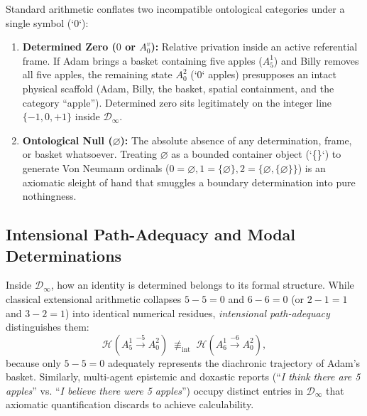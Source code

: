 \documentclass[11pt,a4paper]{article}
\begin{document}
Standard arithmetic conflates two incompatible ontological categories under a single symbol (`0`):
\begin{enumerate}[label=\textbf{(\roman*)}]
    \item \textbf{Determined Zero ($0$ or $A_0^v$):} Relative privation inside an active referential frame. If Adam brings a basket containing five apples ($A_5^1$) and Billy removes all five apples, the remaining state $A_0^2$ (`0` apples) presupposes an intact physical scaffold (Adam, Billy, the basket, spatial containment, and the category ``apple''). Determined zero sits legitimately on the integer line $\{-1, 0, +1\}$ inside $\mathcal{D}_\infty$.
    \item \textbf{Ontological Null ($\varnothing$):} The absolute absence of any determination, frame, or basket whatsoever. Treating $\varnothing$ as a bounded container object (`\{\varnothing\}`) to generate Von Neumann ordinals ($0 = \varnothing, 1 = \{\varnothing\}, 2 = \{\varnothing, \{\varnothing\}\}$) is an axiomatic sleight of hand that smuggles a boundary determination into pure nothingness.
\end{enumerate}

\subsection{Intensional Path-Adequacy and Modal Determinations}

Inside $\mathcal{D}_\infty$, how an identity is determined belongs to its formal structure. While classical extensional arithmetic collapses $5 - 5 = 0$ and $6 - 6 = 0$ (or $2 - 1 = 1$ and $3 - 2 = 1$) into identical numerical residues, \emph{intensional path-adequacy} distinguishes them:
\begin{equation}
\mathcal{H}(A_5^1 \xrightarrow{-5} A_0^2) \;\not\equiv_{\mathrm{int}}\; \mathcal{H}(A_6^1 \xrightarrow{-6} A_0^2),
\end{equation}
because only $5 - 5 = 0$ adequately represents the diachronic trajectory of Adam's basket. Similarly, multi-agent epistemic and doxastic reports (``\emph{I think there are 5 apples}'' vs. ``\emph{I believe there were 5 apples}'') occupy distinct entries in $\mathcal{D}_\infty$ that axiomatic quantification discards to achieve calculability.
\end{document}
